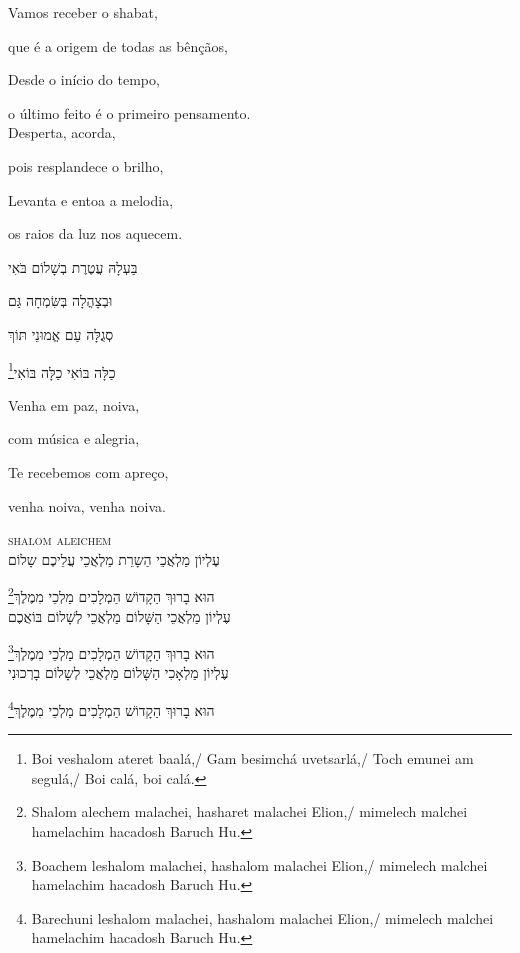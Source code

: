 Vamos receber o shabat,

que é a origem de todas as bênçãos,

Desde o início do tempo,

o último feito é o primeiro pensamento.\\[10pt]

Desperta, acorda,

pois resplandece o brilho,

Levanta e entoa a melodia,

os raios da luz nos aquecem.\\[10pt]

\movetoevenpage
\raggedleft

בַּעְלָהּ עֲטֶרֶת בְשָׁלוֹם בֹּאִי

וּבְצָהֳלָה בְּשִּׂמְחָה גַּם 

סְגֻלָּה עַם אֱמוּנֵי תּוֹךְ 

כַלָּה בּוֹאִי כַלָּה בּוֹאִי\footnote{
Boi veshalom ateret baalá,/ Gam besimchá uvetsarlá,/
Toch emunei am segulá,/ Boi calá, boi calá.}


\movetooddpage
\raggedright


Venha em paz, noiva,

com música e alegria,

Te recebemos com apreço,

venha noiva, venha noiva.

\movetoevenpage
\raggedleft

\textsc{shalom aleichem}\\[15pt]

עֶלְיוֹן מַלְאֲכֵי הַשָרֵת מַלְאֲכֵי עֲלֵיכֶם שָלוֹם

הוּא בָרוּךְ הַקָדוֹשׁ הַמְלָכִים מַלְכֵי מִמֶלֶךְ\footnote{Shalom alechem malachei, hasharet malachei Elion,/
mimelech malchei hamelachim hacadosh Baruch Hu.}\\[10pt]

עֶלְיוֹן מַלְאֲכֵי הַשָּׁלוֹם מַלְאֲכֵי לְשָׁלוֹם בּוֹאֲכֶם

הוּא בָרוּךְ הַקָדוֹשׁ הַמְלָכִים מַלְכֵי מִמֶלֶךְ\footnote{Boachem leshalom malachei, hashalom malachei Elion,/
mimelech malchei hamelachim hacadosh Baruch Hu.}\\[10pt]

עֶלְיוֹן מַלְאָכִי הַשָּׁלוֹם מַלְאֲכֵי לְשָלוֹם בָרְכוּנִי

הוּא בָרוּךְ הַקָדוֹשׁ הַמְלָכִים מַלְכֵי מִמֶלֶךְ\footnote{Barechuni leshalom malachei, hashalom malachei Elion,/
mimelech malchei hamelachim hacadosh Baruch Hu.}\\[10pt] 

